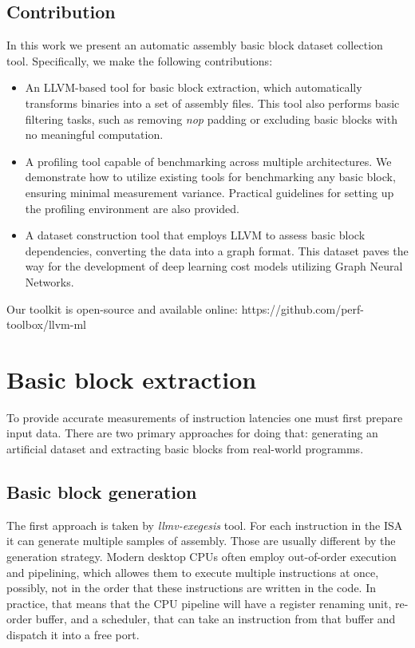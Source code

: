 \subsection{Contribution}

In this work we present an automatic assembly basic block dataset collection tool. Specifically, we make the following contributions:
\begin{itemize}
	\item An LLVM-based tool for basic block extraction, which automatically transforms binaries into a set of assembly files. This tool also performs basic filtering tasks, such as removing \textit{nop} padding or excluding basic blocks with no meaningful computation.

	\item A profiling tool capable of benchmarking across multiple architectures. We demonstrate how to utilize existing tools for benchmarking any basic block, ensuring minimal measurement variance. Practical guidelines for setting up the profiling environment are also provided.
	\item A dataset construction tool that employs LLVM to assess basic block dependencies, converting the data into a graph format. This dataset paves the way for the development of deep learning cost models utilizing Graph Neural Networks.
\end{itemize}
Our toolkit is open-source and available online: https://github.com/perf-toolbox/llvm-ml

\section{Basic block extraction}

To provide accurate measurements of instruction latencies one must first prepare input data. There are two primary approaches for doing that: generating an artificial dataset and extracting basic blocks from real-world programms.

\subsection{Basic block generation}

The first approach is taken by \textit{llmv-exegesis} tool. For each instruction in the ISA it can generate multiple samples of assembly. Those are usually different by the generation strategy. Modern desktop CPUs often employ out-of-order execution and pipelining, which allowes them to execute multiple instructions at once, possibly, not in the order that these instructions are written in the code. In practice, that means that the CPU pipeline will have a register renaming unit, re-order buffer, and a scheduler, that can take an instruction from that buffer and dispatch it into a free port.

